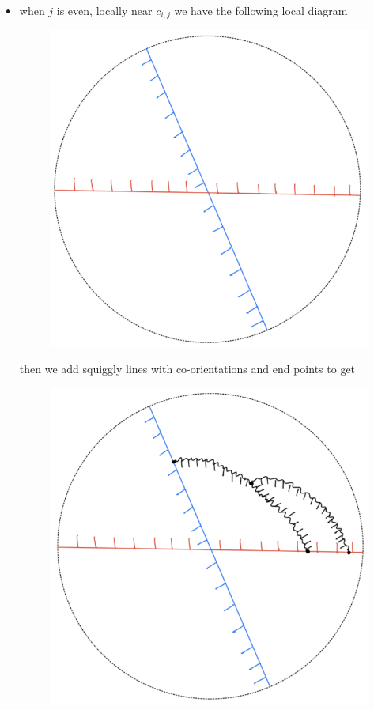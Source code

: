 \begin{definition}
\begin{enumerate}[label = (\roman*)]
\begin{itemize}
\item when $j$ is even, locally near $c_{i,j}$ we have the following local diagram
\begin{figure}[H] 
    \centering
    \includegraphics[scale = 0.95]{diagrams/local_systems_on_as_diagrams/6.png} 
    \caption{}
    \label{fig:your-label}
\end{figure}
then we add squiggly lines with co-orientations and end points to get
\begin{figure}[H] 
    \centering
    \includegraphics[scale = 0.95]{diagrams/local_systems_on_as_diagrams/7.png} 

\end{figure}
\end{itemize}
\end{enumerate}
\end{definition}

